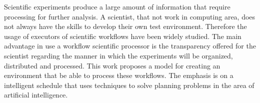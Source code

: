 Scientific experiments produce a large amount of information that require processing for further analysis. A scientist, that not work in computing area, does not always have the skills to develop their own test environment. Therefore the usage of executors of scientific workflows have been widely studied. The main advantage in use a workflow scientific processor is the transparency offered for the scientist regarding the manner in which the experiments will be organized, distributed and processed. This work proposes a model for creating an environment that be able to process these workflows. The emphasis is on a intelligent schedule that uses techniques to solve planning problems in the area of artificial intelligence.